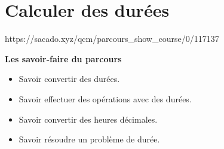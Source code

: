 \chapter{Calculer des durées}
{https://sacado.xyz/qcm/parcours_show_course/0/117137}
{ 

\begin{CpsCol}
\textbf{ Les savoir-faire du parcours}
 \begin{itemize}
 \item Savoir convertir des durées.
 \item Savoir effectuer des opérations avec des durées.
 \item Savoir convertir des heures décimales.
 \item Savoir résoudre un problème de durée. 
 \end{itemize}
\end{CpsCol}

}

